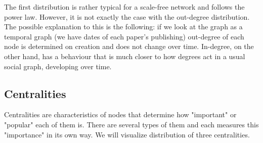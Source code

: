 \documentclass{article}
\newcommand\tab[1][1cm]{\hspace*{#1}}
\begin{document}
The first distribution is rather typical for a scale-free network and follows the power law. However, it is not exactly the case with the out-degree distribution. The possible explanation to this is the following: if we look at the graph as a temporal graph (we have dates of each paper's publishing) out-degree of each node is determined on creation and does not change over time. In-degree, on the other hand, has a behaviour that is much closer to how degrees act in a usual social graph, developing over time.

\subsection{Centralities}
\tab Centralities are characteristics of nodes that determine how "important" or "popular" each of them is. There are several types of them and each measures this "importance" in its own way. We will visualize distribution of three centralities.
\end{document}
